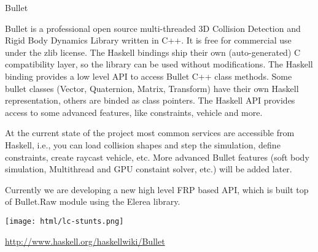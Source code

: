\begin{hcarentry}[updated]{Bullet}
\label{bullet}
\makeheader

Bullet is a professional open source multi-threaded 3D Collision
Detection and Rigid Body Dynamics Library written in C++. It is free
for commercial use under the zlib license. The Haskell bindings ship
their own (auto-generated) C compatibility layer, so the library can
be used without modifications. The Haskell binding provides a low
level API to access Bullet C++ class methods.  Some bullet classes
(Vector, Quaternion, Matrix, Transform) have their own Haskell
representation, others are binded as class pointers. The Haskell API
provides access to some advanced features, like constraints, vehicle
and more.

At the current state of the project most common services are
accessible from Haskell, i.e., you can load collision shapes and step
the simulation, define constraints, create raycast vehicle, etc.  More
advanced Bullet features (soft body simulation, Multithread and GPU
constaint solver, etc.) will be added later.

Currently we are developing a new high level FRP based API, which is
built top of Bullet.Raw module using the Elerea library.

\begin{center}
\texttt{[image: html/lc-stunts.png]}
\end{center}

\FurtherReading
\url{http://www.haskell.org/haskellwiki/Bullet}
\end{hcarentry}
